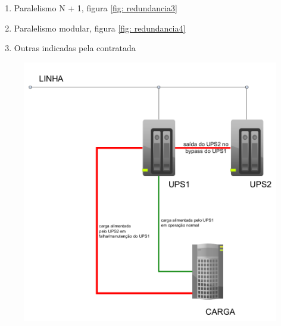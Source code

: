 \begin{enumerate}
\begin{enumerate}
		\item Paralelismo N + 1, figura  \ref{fig: redundancia3}
		
		\item Paralelismo modular, figura  \ref{fig: redundancia4}
		
		\item Outras indicadas pela contratada
		
	\end{enumerate}

	\begin{figure}[H]
		\centering
		\begin{minipage}{0.45\textwidth}
			\centering
			\includegraphics[width=\textwidth]{Figures/7. nobreak/redundancia1.png}
			\label{fig: redundancia1}
		\end{minipage}
		\hfill
		\begin{minipage}{0.45\textwidth}
			\centering

\end{minipage}
\end{figure}
\end{enumerate}
